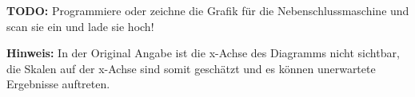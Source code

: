 \begin{solution}
\begin{compactenum}
	\item \textbf{TODO:} Programmiere oder zeichne die Grafik für die Nebenschlussmaschine und scan sie ein und lade sie hoch!
\item \textbf{Hinweis:} In der Original Angabe ist die x-Achse des Diagramms nicht sichtbar, die Skalen auf der x-Achse sind somit geschätzt und es können unerwartete Ergebnisse auftreten.
\end{compactenum}
\end{solution}